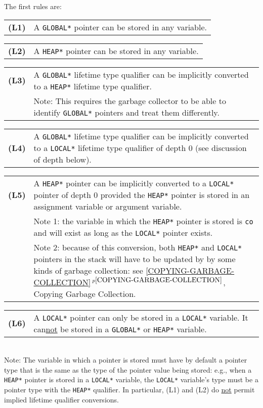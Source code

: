 \documentclass[12pt]{article}
\newcommand{\key}[1]{{\rm \bfseries #1}}
\newcommand{\itemref}[1]{\ref{#1}$\,^{p\pageref{#1}}$}
\newenvironment{indpar}[1][0.3in]%
	{\begin{list}{}%
		     {\setlength{\itemsep}{0in}%
		      \setlength{\topsep}{0in}%
		      \setlength{\parsep}{1ex}%
		      \setlength{\labelwidth}{#1}%
		      \setlength{\leftmargin}{#1}%
		      \addtolength{\leftmargin}{\labelsep}}%
	 \item}%
	{\end{list}}
\begin{document}
The first rules are:
\begin{indpar}[0.2in]
\begin{tabular}{p{0.4in}p{5.0in}}
\key{(L1)}	& A {\tt *GLOBAL*} pointer can be stored in any variable.
\end{tabular}

\begin{tabular}{p{0.4in}p{5.0in}}
\key{(L2)}	& A {\tt *HEAP*} pointer can be stored in any variable.
\end{tabular}

\begin{tabular}{p{0.4in}p{5.0in}}
\key{(L3)}	& A {\tt *GLOBAL*} lifetime type qualifier can be
		  implicitly converted to a {\tt *HEAP*} lifetime type
		  qualifier.
\\[1ex]
		& Note: This requires the garbage collector to be able
		  to identify {\tt *GLOBAL*} pointers and treat them
		  differently.
\end{tabular}

\begin{tabular}{p{0.4in}p{5.0in}}
\key{(L4)}	& A {\tt *GLOBAL*} lifetime type qualifier can be
		  implicitly converted to a {\tt *LOCAL*} lifetime type
		  qualifier of depth 0 (see discussion of depth below).
\end{tabular}

\begin{tabular}{p{0.4in}p{5.0in}}
\key{(L5)}	& A {\tt *HEAP*} pointer can be implicitly
                  converted to a {\tt *LOCAL*} pointer of depth 0
		  provided the {\tt *HEAP*} pointer is stored in
		  an assignment variable or argument variable.
\\[1ex]
		& Note 1: the variable in which the {\tt *HEAP*} pointer
		  is stored is {\tt co} and will exist as long as
		  the {\tt *LOCAL*} pointer exists.
\\[1ex]
		& Note 2: because of this conversion, both {\tt *HEAP*}
		  and {\tt *LOCAL*} pointers in the stack will have
		  to be updated by by some kinds of garbage collection: see
		  \itemref{COPYING-GARBAGE-COLLECTION}, Copying Garbage
		  Collection.
\end{tabular}

\begin{tabular}{p{0.4in}p{5.0in}}
\key{(L6)}	& A {\tt *LOCAL*} pointer can only be stored in a
                  {\tt *LOCAL*} variable.  It
                  can\underline{not} be stored in a
		  {\tt *GLOBAL*} or {\tt *HEAP*} variable.
\end{tabular}
\\[1ex]
Note: The variable in which a pointer is stored
must have by default a pointer type that is the same as the
type of the pointer value being stored:
e.g., when a {\tt *HEAP*} pointer is stored in a {\tt *LOCAL*}
variable, the {\tt *LOCAL*} variable's type must be a pointer type
with the {\tt *HEAP*} qualifier.
In particular, (L1) and (L2) do \underline{not} permit implied
lifetime qualifier conversions.


\end{indpar}
\end{document}
